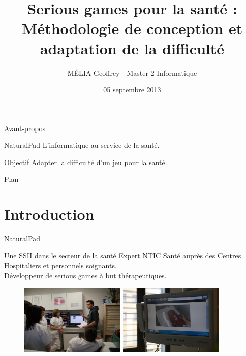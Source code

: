 \documentclass{beamer}
\title[Conception et adaptation de Serious Games]{Serious games pour la santé :\\ Méthodologie de conception et adaptation de la difficulté}
\author{MÉLIA Geoffrey - Master 2 Informatique}
\institute{Université Montpellier II - NaturalPad}
\date{05 septembre 2013}
\begin{document}
\begin{frame}
	\titlepage
\end{frame}

\begin{frame}{Avant-propos}
	\begin{block}{NaturalPad}
		L'informatique au service de la santé.
	\end{block}		
	\begin{block}{Objectif}
		Adapter la difficulté d'un jeu pour la santé.
	\end{block}		
\end{frame}

\begin{frame}{Plan}
	\tableofcontents
\end{frame}

\section{Introduction}
	
	\begin{frame}{NaturalPad}
		\begin{block}{Une SSII dans le secteur de la santé}
			Expert NTIC Santé auprès des Centres Hospitaliers et personnels soignants.\\
			Développeur de serious games à but thérapeutiques.
		\end{block}
		
		\begin{figure}
			\includegraphics[width=5cm]{../images/formation.jpg}
			\includegraphics[width=5cm]{../images/bebeonline.jpg}		
		\end{figure}
	\end{frame}	
\end{document}

